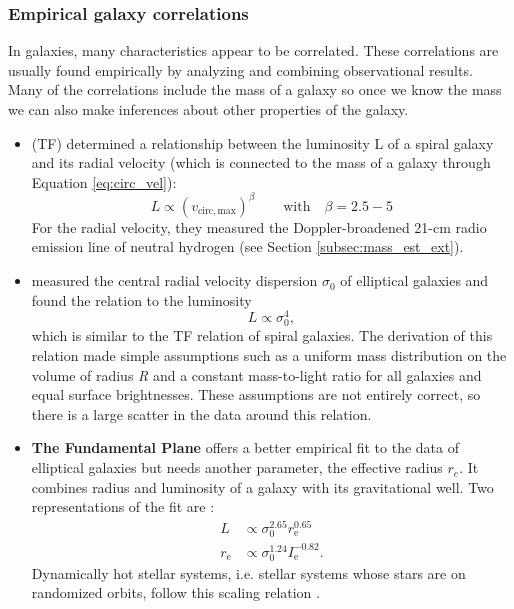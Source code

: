 \subsubsection{Empirical galaxy correlations}
In galaxies, many characteristics appear to be correlated. These correlations are usually found empirically by analyzing and combining observational results. Many of the correlations include the mass of a galaxy so once we know the mass we can also make inferences about other properties of the galaxy. 
\begin{itemize}
    \item \textbf{\citet{Tully...Fisher...1977}} (TF) determined a relationship between the luminosity L of a spiral galaxy and its radial velocity (which is connected to the mass of a galaxy through Equation \ref{eq:circ_vel}):
    \begin{equation}
        L \propto (v_{\mathrm{circ, max}})^\beta \qquad \mathrm{with}\quad \beta =  2.5 - 5
    \end{equation}
    For the radial velocity, they measured the Doppler-broadened 21-cm radio emission line of neutral hydrogen (see Section \ref{subsec:mass_est_ext}). 
    \item \textbf{\citet{Faber...Jackson...1976}} measured the central radial velocity dispersion $\sigma_0$ of elliptical galaxies and found the relation to the luminosity  
    \begin{equation}
        L \propto \sigma_0^4,
    \end{equation}
    which is similar to the \acs{TF} relation of spiral galaxies. The derivation of this relation made simple assumptions such as a uniform mass distribution on the volume of radius \textit{R} and a constant mass-to-light ratio for all galaxies and equal surface brightnesses. These assumptions are not entirely correct, so there is a large scatter in the data around this relation.
    \item \textbf{The Fundamental Plane} offers a better empirical fit to the data of elliptical galaxies but needs another parameter, the effective radius $r_e$. It combines radius and luminosity of a galaxy with its gravitational well. Two representations of the fit are \citep{Carroll...Ostlie..2006}:
    \begin{align}
        L &\propto \sigma_0^{2.65}r_\mathrm{e}^{0.65} \\
        r_\mathrm{e} &\propto \sigma_0^{1.24}I_\mathrm{e}^{-0.82}.
    \end{align}
    Dynamically hot stellar systems, i.e. stellar systems whose stars are on randomized orbits, follow this scaling relation \citep{Misgeld...hotss.FP...2011}.

\end{itemize}

